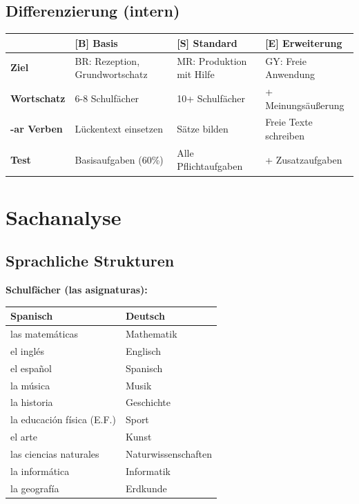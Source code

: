 \documentclass[11pt,a4paper]{article}
\newcommand{\B}{\textcolor{basis}{\textbf{[B]}}}
\newcommand{\Std}{\textcolor{standard}{\textbf{[S]}}}
\newcommand{\E}{\textcolor{erweiterung}{\textbf{[E]}}}
\begin{document}
\subsection{Differenzierung (intern)}
\begin{tabular}{|l|p{3.5cm}|p{3.5cm}|p{3.5cm}|}
\hline
& \B{} \textbf{Basis} & \Std{} \textbf{Standard} & \E{} \textbf{Erweiterung} \\
\hline
\textbf{Ziel} & BR: Rezeption, Grundwortschatz & MR: Produktion mit Hilfe & GY: Freie Anwendung \\
\hline
\textbf{Wortschatz} & 6-8 Schulfächer & 10+ Schulfächer & + Meinungsäußerung \\
\hline
\textbf{-ar Verben} & Lückentext einsetzen & Sätze bilden & Freie Texte schreiben \\
\hline
\textbf{Test} & Basisaufgaben (60\%) & Alle Pflichtaufgaben & + Zusatzaufgaben \\
\hline
\end{tabular}

\section{Sachanalyse}

\subsection{Sprachliche Strukturen}

\textbf{Schulfächer (las asignaturas):}
\begin{center}
\begin{tabular}{|l|l|}
\hline
\textbf{Spanisch} & \textbf{Deutsch} \\
\hline
las matemáticas & Mathematik \\
el inglés & Englisch \\
el español & Spanisch \\
la música & Musik \\
la historia & Geschichte \\
la educación física (E.F.) & Sport \\
el arte & Kunst \\
las ciencias naturales & Naturwissenschaften \\
la informática & Informatik \\
la geografía & Erdkunde \\
\hline
\end{tabular}
\end{center}
\end{document}
